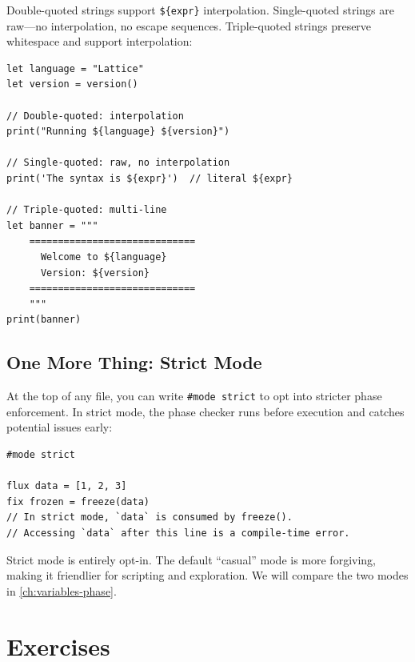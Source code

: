 Double-quoted strings support \lstinline|${expr}| interpolation.
Single-quoted strings are raw---no interpolation, no escape sequences.
Triple-quoted strings preserve whitespace and support interpolation:

\begin{lstlisting}[language=Lattice, caption={String varieties}]
let language = "Lattice"
let version = version()

// Double-quoted: interpolation
print("Running ${language} ${version}")

// Single-quoted: raw, no interpolation
print('The syntax is ${expr}')  // literal ${expr}

// Triple-quoted: multi-line
let banner = """
    =============================
      Welcome to ${language}
      Version: ${version}
    =============================
    """
print(banner)
\end{lstlisting}

\subsection{One More Thing: Strict Mode}\label{subsec:strict-taste}

At the top of any file, you can write \lstinline|#mode strict| to opt into stricter phase enforcement.
In strict mode, the phase checker runs before execution and catches potential issues early:

\begin{lstlisting}[language=Lattice, caption={Strict mode}]
#mode strict

flux data = [1, 2, 3]
fix frozen = freeze(data)
// In strict mode, `data` is consumed by freeze().
// Accessing `data` after this line is a compile-time error.
\end{lstlisting}

Strict mode is entirely opt-in.
The default ``casual'' mode is more forgiving, making it friendlier for scripting and exploration.
We will compare the two modes in \cref{ch:variables-phase}.

\section{Exercises}\label{sec:ch01-exercises}

